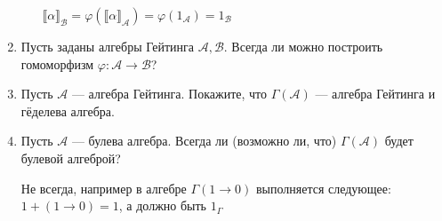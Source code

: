 \begin{enumerate}[wide, labelwidth=!, labelindent=0pt]
\begin{enumerate}
                        \(\llbracket \alpha \rrbracket_{\mathcal{B}} = \varphi(\llbracket \alpha \rrbracket_{\mathcal{A}}) = \varphi(1_{\mathcal{A}}) = 1_{\mathcal{B}}\)
            \end{enumerate}

      \item Пусть заданы алгебры Гейтинга $\mathcal{A},\mathcal{B}$. Всегда ли можно построить гомоморфизм $\varphi: \mathcal{A}\rightarrow\mathcal{B}$?

      \item Пусть $\mathcal{A}$ --- алгебра Гейтинга. Покажите, что $\Gamma(\mathcal{A})$ --- алгебра Гейтинга и гёделева алгебра.

      \item Пусть $\mathcal{A}$ --- булева алгебра. Всегда ли (возможно ли, что) $\Gamma(\mathcal{A})$ будет булевой алгеброй?

            Не всегда, например в алгебре \(\Gamma(1 \to 0)\) выполняется следующее: \(1 + (1 \to 0) = 1\), а должно быть \(1_\Gamma\)
\end{enumerate}

